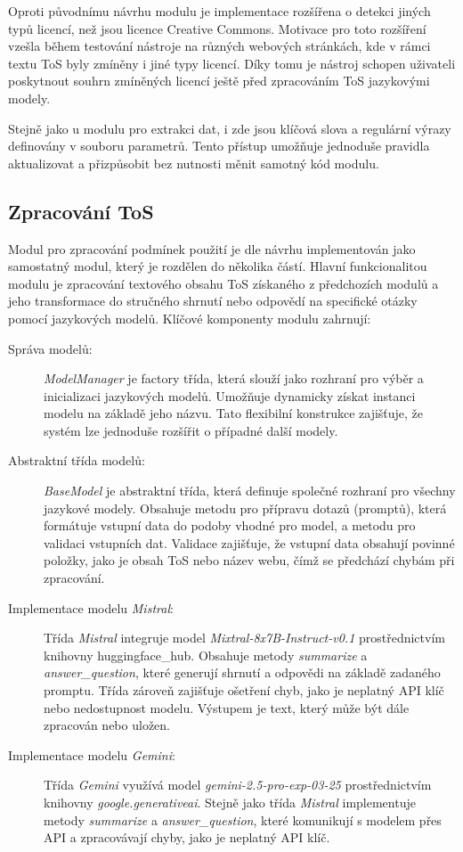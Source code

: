Oproti původnímu návrhu modulu je implementace rozšířena o detekci jiných typů licencí, než jsou licence Creative Commons.
Motivace pro toto rozšíření vzešla během testování nástroje na různých webových stránkách, kde v rámci textu ToS byly zmíněny i jiné typy licencí.
Díky tomu je nástroj schopen uživateli poskytnout souhrn zmíněných licencí ještě před zpracováním ToS jazykovými modely.

Stejně jako u modulu pro extrakci dat, i zde jsou klíčová slova a regulární výrazy definovány v souboru parametrů.
Tento přístup umožňuje jednoduše pravidla aktualizovat a přizpůsobit bez nutnosti měnit samotný kód modulu.

\subsection{Zpracování ToS}
Modul pro zpracování podmínek použití je dle návrhu implementován jako samostatný modul, který je rozdělen do několika částí.
Hlavní funkcionalitou modulu je zpracování textového obsahu ToS získaného z předchozích modulů a jeho transformace do stručného shrnutí nebo odpovědí na specifické otázky pomocí jazykových modelů.
Klíčové komponenty modulu zahrnují:

\begin{description}
    \item[Správa modelů:] \textit{ModelManager} je factory třída, která slouží jako rozhraní pro výběr a inicializaci jazykových modelů. Umožňuje dynamicky získat instanci modelu na základě jeho názvu. Tato flexibilní konstrukce zajišťuje, že systém lze jednoduše rozšířit o případné další modely.
    \item[Abstraktní třída modelů:] \textit{BaseModel} je abstraktní třída, která definuje společné rozhraní pro všechny jazykové modely. Obsahuje metodu pro přípravu dotazů (promptů), která formátuje vstupní data do podoby vhodné pro model, a metodu pro validaci vstupních dat. Validace zajišťuje, že vstupní data obsahují povinné položky, jako je obsah ToS nebo název webu, čímž se předchází chybám při zpracování.
    \item[Implementace modelu \textit{Mistral}:] Třída \textit{Mistral} integruje model \textit{Mixtral-8x7B-Instruct-v0.1} prostřednictvím knihovny huggingface_hub. Obsahuje metody \textit{summarize} a \textit{answer\_question}, které generují shrnutí a odpovědi na základě zadaného promptu. Třída zároveň zajišťuje ošetření chyb, jako je neplatný API klíč nebo nedostupnost modelu. Výstupem je text, který může být dále zpracován nebo uložen.
    \item[Implementace modelu \textit{Gemini}:] Třída \textit{Gemini} využívá model \textit{gemini-2.5-pro-exp-03-25} prostřednictvím knihovny \textit{google.generativeai}. Stejně jako třída \textit{Mistral} implementuje metody \textit{summarize} a \textit{answer\_question}, které komunikují s modelem přes API a zpracovávají chyby, jako je neplatný API klíč.
\end{description}

